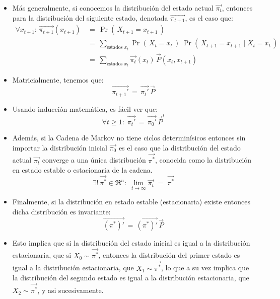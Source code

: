 \documentclass[ 10pt, xcolor = dvipsnames]{beamer}
\begin{document}
\begin{frame}[allowframebreaks]
\begin{itemize}
\item M\'as generalmente, si conocemos la distribuci\'on del estado actual $\vec{\pi_t}$, entonces para la distribuci\'on del siguiente estado, denotada $\vec{\pi_{t+1}}$, \linebreak es el caso que: 
\begin{align*}
\forall x_{t+1} \colon \, \vec{\pi_{t+1}}(x_{t+1}) \, 
& = \, \Pr( \, X_{t+1} = x_{t+1} \, ) \\[1ex]
& = \, \sum_{\text{estados } x_t} \Pr( \, X_t = x_t \, ) \; \Pr( \, X_{t+1} = x_{t+1} \mid X_t = x_t \, ) \\[1ex]
& = \, \sum_{\text{estados } x_t} \vec{\pi_t}(x_t) \, \vec{P}(x_t,x_{t+1})
\end{align*}
\item Matricialmente, tenemos que: 
\[
\vec{\pi_{t+1}'} \, = \, \vec{\pi_t'} \, \vec{P}
\]
\end{itemize}
\framebreak

\begin{itemize}
\item Usando inducci\'on matem\'atica, es f\'acil ver que: 
\[
\forall t \geq 1 \colon \;
\vec{\pi_t'} \, = \, \vec{\pi_0'} \, \vec{P}^t
\]
\item Adem\'as, si la Cadena de Markov no tiene ciclos determin\'isicos entonces \linebreak sin importar la distribuci\'on inicial $\vec{\pi_0}$ es el caso que la distribuci\'on del \linebreak estado actual $\vec{\pi_t}$ converge a una \'unica distribuci\'on $\vec{\pi^*}$, conocida como la distribuci\'on en estado estable o estacionaria de la cadena. \Iec 
\[
\exists! \, \vec{\pi^*} \in \Re^n \colon \;
\lim_{ t \rightarrow \infty } \vec{\pi_t} \; = \;
\vec{\pi^*}
\]
\end{itemize}
\framebreak

\begin{itemize}
\item Finalmente, si la distribuci\'on en estado estable (estacionaria) existe \linebreak entonces dicha distribuci\'on es invariante: 
\[
\vec{(\pi^*)'} \, = \, \vec{(\pi^*)'} \, \vec{P}
\]
\item Esto implica que si la distribuci\'on del estado inicial es igual a la distribuci\'on estacionaria, \ie que si $X_0 \sim \vec{\pi^*}$, entonces la distribuci\'on del primer estado es igual a la distribuci\'on estacionaria, \ie que $X_1 \sim \vec{\pi^*}$, lo que a su vez implica que la distribuci\'on del segundo estado es igual a la distribuci\'on estacionaria, \ie que $X_2 \sim \vec{\pi^*}$, y asi sucesivamente. 
\end{itemize}

\end{frame}
\end{document}

